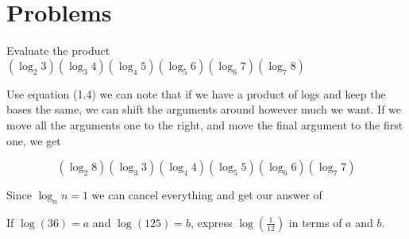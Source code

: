 \hfuzz=100pt 



\newpage
\section{Problems}


\begin{question}

Evaluate the product $(\log_2{3})(\log_3{4})(\log_4{5})(\log_5{6})(\log_6{7})(\log_7{8})$

\end{question}

\begin{solution}

Use equation (1.4) we can note that if we have a product of logs and keep the bases the same, we can shift the arguments around however much we want. If we move all the arguments one to the right, and move the final argument to the first one, we get

$$(\log_2{8})(\log_3{3})(\log_4{4})(\log_5{5})(\log_6{6})(\log_7{7})$$

Since $\log_n{n} = 1$ we can cancel everything and get our answer of  

\end{solution}


\begin{question}

If $\log(36) = a$ and $\log(125) = b$, express $\log(\frac{1}{12})$ in terms of $a$ and $b$.

\end{question}

